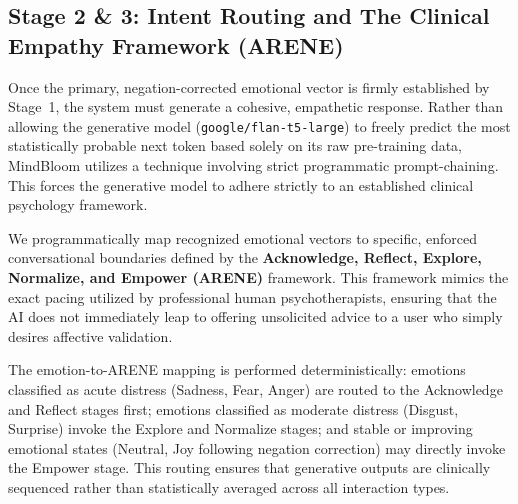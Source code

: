 \documentclass[12pt,twoside]{article}
\begin{document}
\subsection{Stage 2 \& 3: Intent Routing and The Clinical Empathy Framework (ARENE)}

Once the primary, negation-corrected emotional vector is firmly established by Stage~1, the system must generate a cohesive, empathetic response. Rather than allowing the generative model (\texttt{google/flan-t5-large}) to freely predict the most statistically probable next token based solely on its raw pre-training data, MindBloom utilizes a technique involving strict programmatic prompt-chaining. This forces the generative model to adhere strictly to an established clinical psychology framework.

We programmatically map recognized emotional vectors to specific, enforced conversational boundaries defined by the \textbf{Acknowledge, Reflect, Explore, Normalize, and Empower (ARENE)} framework. This framework mimics the exact pacing utilized by professional human psychotherapists, ensuring that the AI does not immediately leap to offering unsolicited advice to a user who simply desires affective validation.

The emotion-to-ARENE mapping is performed deterministically: emotions classified as acute distress (Sadness, Fear, Anger) are routed to the Acknowledge and Reflect stages first; emotions classified as moderate distress (Disgust, Surprise) invoke the Explore and Normalize stages; and stable or improving emotional states (Neutral, Joy following negation correction) may directly invoke the Empower stage. This routing ensures that generative outputs are clinically sequenced rather than statistically averaged across all interaction types.
\end{document}
